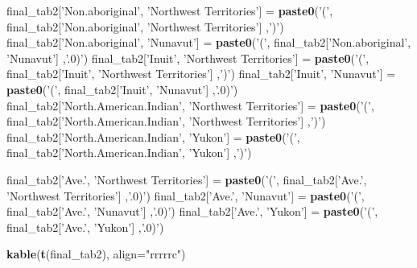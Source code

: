 \documentclass[9pt,letter]{article}
\newenvironment{Shaded}{\begin{snugshade}}{\end{snugshade}}
\newcommand{\KeywordTok}[1]{\textcolor[rgb]{0.13,0.29,0.53}{\textbf{#1}}}
\newcommand{\DataTypeTok}[1]{\textcolor[rgb]{0.13,0.29,0.53}{#1}}
\newcommand{\StringTok}[1]{\textcolor[rgb]{0.31,0.60,0.02}{#1}}
\newcommand{\NormalTok}[1]{#1}
\begin{document}
\begin{Shaded}
\begin{Highlighting}[]
\NormalTok{final_tab2[}\StringTok{'Non.aboriginal'}\NormalTok{, }\StringTok{'Northwest Territories'}\NormalTok{] =}\StringTok{ }
\StringTok{  }\KeywordTok{paste0}\NormalTok{(}\StringTok{'('}\NormalTok{, final_tab2[}\StringTok{'Non.aboriginal'}\NormalTok{, }\StringTok{'Northwest Territories'}\NormalTok{] ,}\StringTok{')'}\NormalTok{)}
\NormalTok{final_tab2[}\StringTok{'Non.aboriginal'}\NormalTok{, }\StringTok{'Nunavut'}\NormalTok{] =}\StringTok{ }
\StringTok{  }\KeywordTok{paste0}\NormalTok{(}\StringTok{'('}\NormalTok{, final_tab2[}\StringTok{'Non.aboriginal'}\NormalTok{, }\StringTok{'Nunavut'}\NormalTok{] ,}\StringTok{'.0)'}\NormalTok{)}
\NormalTok{final_tab2[}\StringTok{'Inuit'}\NormalTok{, }\StringTok{'Northwest Territories'}\NormalTok{] =}\StringTok{ }
\StringTok{  }\KeywordTok{paste0}\NormalTok{(}\StringTok{'('}\NormalTok{, final_tab2[}\StringTok{'Inuit'}\NormalTok{, }\StringTok{'Northwest Territories'}\NormalTok{] ,}\StringTok{')'}\NormalTok{)}
\NormalTok{final_tab2[}\StringTok{'Inuit'}\NormalTok{, }\StringTok{'Nunavut'}\NormalTok{] =}\StringTok{ }
\StringTok{  }\KeywordTok{paste0}\NormalTok{(}\StringTok{'('}\NormalTok{, final_tab2[}\StringTok{'Inuit'}\NormalTok{, }\StringTok{'Nunavut'}\NormalTok{] ,}\StringTok{'.0)'}\NormalTok{)}
\NormalTok{final_tab2[}\StringTok{'North.American.Indian'}\NormalTok{, }\StringTok{'Northwest Territories'}\NormalTok{] =}\StringTok{ }
\StringTok{  }\KeywordTok{paste0}\NormalTok{(}\StringTok{'('}\NormalTok{, final_tab2[}\StringTok{'North.American.Indian'}\NormalTok{, }\StringTok{'Northwest Territories'}\NormalTok{] ,}\StringTok{')'}\NormalTok{)}
\NormalTok{final_tab2[}\StringTok{'North.American.Indian'}\NormalTok{, }\StringTok{'Yukon'}\NormalTok{] =}\StringTok{ }
\StringTok{  }\KeywordTok{paste0}\NormalTok{(}\StringTok{'('}\NormalTok{, final_tab2[}\StringTok{'North.American.Indian'}\NormalTok{, }\StringTok{'Yukon'}\NormalTok{] ,}\StringTok{')'}\NormalTok{)}

\NormalTok{final_tab2[}\StringTok{'Ave.'}\NormalTok{, }\StringTok{'Northwest Territories'}\NormalTok{] =}\StringTok{ }
\StringTok{  }\KeywordTok{paste0}\NormalTok{(}\StringTok{'('}\NormalTok{, final_tab2[}\StringTok{'Ave.'}\NormalTok{, }\StringTok{'Northwest Territories'}\NormalTok{] ,}\StringTok{'.0)'}\NormalTok{)}
\NormalTok{final_tab2[}\StringTok{'Ave.'}\NormalTok{, }\StringTok{'Nunavut'}\NormalTok{] =}\StringTok{ }
\StringTok{  }\KeywordTok{paste0}\NormalTok{(}\StringTok{'('}\NormalTok{, final_tab2[}\StringTok{'Ave.'}\NormalTok{, }\StringTok{'Nunavut'}\NormalTok{] ,}\StringTok{'.0)'}\NormalTok{)}
\NormalTok{final_tab2[}\StringTok{'Ave.'}\NormalTok{, }\StringTok{'Yukon'}\NormalTok{] =}\StringTok{ }
\StringTok{  }\KeywordTok{paste0}\NormalTok{(}\StringTok{'('}\NormalTok{, final_tab2[}\StringTok{'Ave.'}\NormalTok{, }\StringTok{'Yukon'}\NormalTok{] ,}\StringTok{'.0)'}\NormalTok{)}

\KeywordTok{kable}\NormalTok{(}\KeywordTok{t}\NormalTok{(final_tab2),  }\DataTypeTok{align=}\StringTok{"rrrrrc"}\NormalTok{)}
\end{Highlighting}
\end{Shaded}
\end{document}
